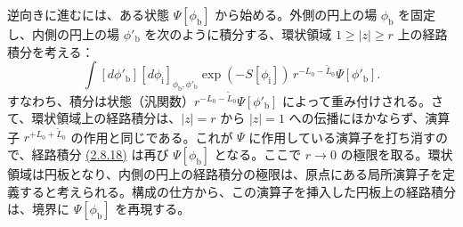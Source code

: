逆向きに進むには、ある状態 $\Psi[\phi_{\mathrm b}]$ から始める。外側の円上の場 $\phi_{\mathrm b}$ を固定し、内側の円上の場 $\phi'_{\mathrm b}$ を次のように積分する、環状領域 $1\geq|z|\geq r$ 上の経路積分を考える：
\begin{equation}
\int[d\phi'_{\mathrm b}]
[d\phi_{\mathrm i}]_{\phi_{\mathrm b},\phi'_{\mathrm b}}
\exp(-S[\phi_{\mathrm i}])\,
r^{-L_0-\widetilde L_0}\Psi[\phi'_{\mathrm b}].
\tag{2.8.18}\label{eq:2.8.18}
\end{equation}
すなわち、積分は状態（汎関数）$r^{-L_0-\widetilde L_0}\Psi[\phi'_{\mathrm b}]$ によって重み付けされる。さて、環状領域上の経路積分は、$|z|=r$ から $|z|=1$ への伝播にほかならず、演算子 $r^{+L_0+\widetilde L_0}$ の作用と同じである。これが $\Psi$ に作用している演算子を打ち消すので、経路積分 \hyperref[eq:2.8.18]{(2.8.18)} は再び $\Psi[\phi_{\mathrm b}]$ となる。ここで $r\to0$ の極限を取る。環状領域は円板となり、内側の円上の経路積分の極限は、原点にある局所演算子を定義すると考えられる。構成の仕方から、この演算子を挿入した円板上の経路積分は、境界に $\Psi[\phi_{\mathrm b}]$ を再現する。

